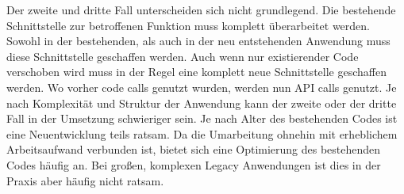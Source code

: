 Der zweite und dritte Fall unterscheiden sich nicht grundlegend. Die bestehende Schnittstelle zur betroffenen Funktion muss komplett überarbeitet werden. Sowohl in der bestehenden, als auch in der neu entstehenden Anwendung muss diese Schnittstelle geschaffen werden. Auch wenn nur existierender Code verschoben wird muss in der Regel eine komplett neue Schnittstelle geschaffen werden. Wo vorher code calls genutzt wurden, werden nun API calls genutzt. 
Je nach Komplexität und Struktur der Anwendung kann der zweite oder der dritte Fall in der Umsetzung schwieriger sein. Je nach Alter des bestehenden Codes ist eine Neuentwicklung teils ratsam. Da die Umarbeitung ohnehin mit erheblichem Arbeitsaufwand verbunden ist, bietet sich eine Optimierung des bestehenden Codes häufig an. Bei großen, komplexen Legacy Anwendungen ist dies in der Praxis aber häufig nicht ratsam.

